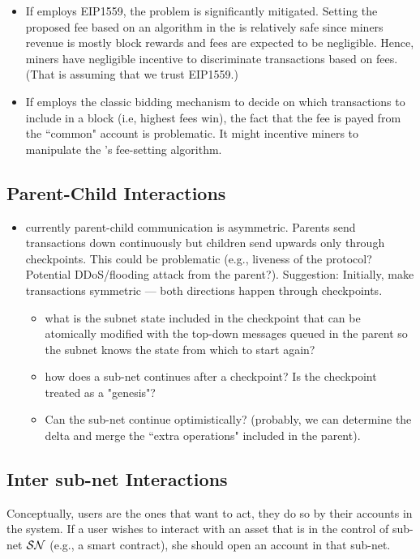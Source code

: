 \begin{itemize}
    \item If \parent{$\SN$} employs EIP1559, the problem is significantly mitigated. Setting the proposed fee based on an algorithm in the \actor{} is relatively safe since miners revenue is mostly block rewards and fees are expected to be negligible. Hence, miners have negligible incentive to discriminate transactions based on fees. (That is assuming that we trust EIP1559.)
    \item If \parent{$\SN$} employs the classic bidding mechanism to decide on which transactions to include in a block (i.e, highest fees win), the fact that the fee is payed from the ``common" account is problematic. It might incentive miners to manipulate the \actor 's fee-setting algorithm.
\end{itemize}

\subsection{Parent-Child Interactions}
\label{sec:P-C interactions}
\begin{itemize}
    \item currently parent-child communication is asymmetric. Parents send transactions down continuously but children send upwards only through checkpoints. This could be problematic (e.g., liveness of the protocol? Potential DDoS/flooding attack from the parent?). Suggestion: Initially, make transactions symmetric --- both directions happen through checkpoints.
    \begin{itemize}
        \item what is the subnet state included in the checkpoint that can be atomically modified with the top-down messages queued in the parent so the subnet knows the state from which to start again?
        \item how does a sub-net continues after a checkpoint? Is the checkpoint treated as a "genesis"?
        \item Can the sub-net continue optimistically? (probably, we can determine the delta and merge the ``extra operations" included in the parent).
    \end{itemize}
\end{itemize}

\subsection{Inter sub-net Interactions}
\label{sec:inter subnet interactions}
Conceptually, users are the ones that want to act, they do so by their accounts in the system.
If a user wishes to interact with an asset that is in the control of sub-net $\SN$ (e.g., a smart contract), she should open an account in that sub-net. 

